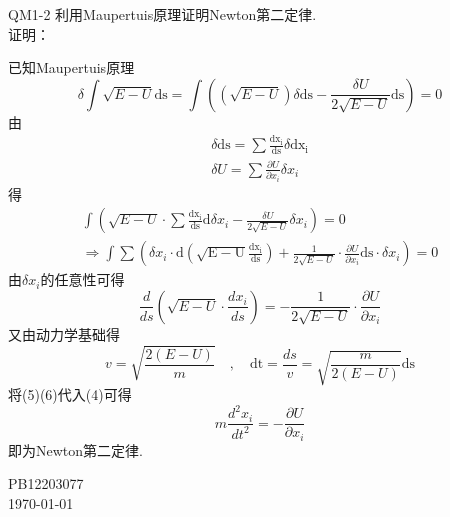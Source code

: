 \documentclass[a4paper,11pt]{article}
\begin{document}
    \begin{CJK*}{UTF8}{kai}
    QM1-2 \quad 利用Maupertuis原理证明Newton第二定律.\\[0.5cm]
    证明：\\[3pt]
    \end{CJK*}
    \begin{CJK*}{UTF8}{song}
    \indent 已知Maupertuis原理
    \begin{equation}
    \label{f}
    \delta \int \sqrt{E - U}\mathrm{ds} 
    = \int ((\sqrt{E-U})\delta\mathrm{ds} - \frac{\delta U}{2\sqrt{E-U}}\mathrm{ds})
    = 0
    \end{equation}
    \indent 由
    \begin{eqnarray}
    \delta \mathrm{ds} = \sum\frac{\mathrm{d x_{i}}}{\mathrm{ds}}\delta \mathrm{d x_{i}} \\
     \delta U = \sum \frac{\partial U}{\partial x_{i}}\delta x_{i}
    \end{eqnarray}
    \indent 得
    \begin{eqnarray}
    \int  (\sqrt{E-U}\cdot\sum\frac{\mathrm{d x_{i}}}{\mathrm{ds}} \mathrm{d} \delta x_{i}
    - \frac{\delta U}{2\sqrt{E-U}}\delta x_{i})  =   0 \nonumber \\
    \Rightarrow \int \sum (\delta x_{i}\cdot \mathrm{d (\sqrt{E-U}\frac{d x_{i}}{ds})}   + 
    \frac{1}{2\sqrt{E-U}} \cdot \frac{\partial U}{\partial x_{i}} \mathrm{ds} \cdot\delta x_{i}) =  0
    \end{eqnarray}
    \indent 由$\delta x_{i}$的任意性可得
    \begin{equation}
    \frac{d}{ds}(\sqrt{E-U}\cdot \frac{d x_{i}}{ds}) 
    = - \frac{1}{2\sqrt{E-U}}\cdot \frac{\partial U}{\partial x_{i}}
    \end{equation}
    \indent 又由动力学基础得
    \begin{equation}
    v = \sqrt{\frac{2(E-U)}{m}} \quad,
    \quad \mathrm{d t} = \frac{ds}{v} = \sqrt{\frac{m}{2(E-U)}} \mathrm{d s}
    \end{equation}
    \indent 将(5)(6)代入(4)可得
    $$ m \frac{d^{2} x_{i}}{d t^{2}} = - \frac{\partial U}{\partial x_{i}} $$
    \indent 即为Newton第二定律.\\
    \end{CJK*}
    \begin{CJK*}{UTF8}{kai}
        \begin{flushright}
            \small PB12203077\\
            \footnotesize \today
        \end{flushright}
    \end{CJK*}
\end{document}
